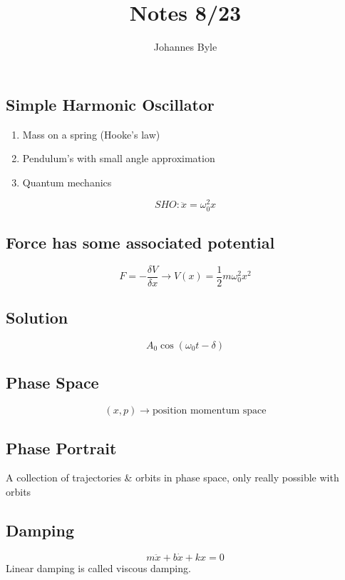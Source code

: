 \documentclass[12pt]{article}
\title{Notes 8/23}
\author{Johannes Byle}
\begin{document}
    \maketitle

    \subsection*{Simple Harmonic Oscillator}
    \begin{enumerate}
        \item Mass on a spring (Hooke's law)
        \item Pendulum's with small angle approximation
        \item Quantum mechanics
    \end{enumerate}
    \[
        SHO: \ddot{x}=\omega_{0}^{2}x
    \]

    \subsection*{Force has some associated potential}
    \[
        F=-\frac{\delta V}{\delta x}\rightarrow V(x)=\frac{1}{2}m\omega_{0}^{2}x^{2}
    \]

    \subsection*{Solution}
    \[
        A_0\cos(\omega_0t-\delta)
    \]

    \subsection*{Phase Space}
    \[
        (x,p)\rightarrow \text{position momentum space}
    \]
    \begin{center}
    \end{center}

    \subsection*{Phase Portrait}
    A collection of trajectories & orbits in phase space, only really possible with orbits

    \subsection*{Damping}
    \[
        m\ddot{x}+b\dot{x}+kx=0
    \]
    Linear damping is called viscous damping.
\end{document}
